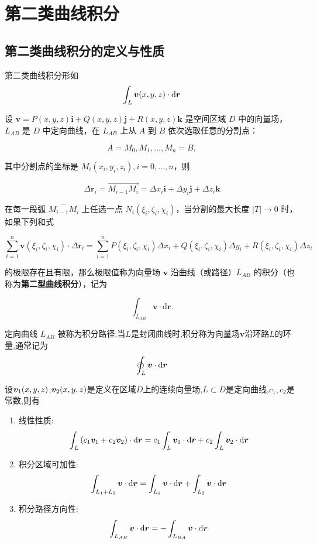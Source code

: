 \setcounter{chapter}{27} %

\chapter{第二类曲线积分}

\section{第二类曲线积分的定义与性质}

第二类曲线积分形如$$\int_L \bm{v}(x,y,z) \cdot \operatorname{d\!} \bm{r}$$

\begin{definition}
    设 $\bm{v} = P(x,y,z)\bm{i} + Q(x,y,z)\bm{j} + R(x,y,z)\bm{k}$ 是空间区域 $D$ 中的向量场，$L_{AB}$ 是 $D$ 中定向曲线，在 $L_{AB}$ 上从 $A$ 到 $B$ 依次选取任意的分割点：

\[
A = M_0, M_1, \dots, M_n = B,
\]

其中分割点的坐标是 $M_i(x_i, y_i, z_i), i = 0, \dots, n$，则

\[
\Delta \bm{r}_i = \overrightarrow{M_{i-1}M_i} = \Delta x_i \bm{i} + \Delta y_i \bm{j} + \Delta z_i \bm{k}
\]

在每一段弧 $\overset{\frown}{M_{i-1}M_i}$ 上任选一点 $N_i(\xi_i, \zeta_i, \chi_i)$，当分割的最大长度 $|T| \to 0$ 时，如果下列和式

\[
\sum_{i=1}^{n} \bm{v}(\xi_i, \zeta_i, \chi_i) \cdot \Delta \bm{r}_i = \sum_{i=1}^{n}  P(\xi_i, \zeta_i, \chi_i)\Delta x_i + Q(\xi_i, \zeta_i, \chi_i)\Delta y_i + R(\xi_i, \zeta_i, \chi_i)\Delta z_i 
\]

的极限存在且有限，那么极限值称为向量场 $\bm{v}$ 沿曲线（或路径）$L_{AB}$ 的积分（也称为\textbf{第二型曲线积分}），记为

\[
\int_{L_{AB}} \bm{v} \cdot \mathrm{d}\bm{r}.
\]

定向曲线 $L_{AB}$ 被称为积分路径.当$L$是封闭曲线时,积分称为向量场$\bm v$沿环路$L$的环量,通常记为
$$\oint_L \bm v \cdot \operatorname{d\!} \bm r$$
\end{definition}

\begin{proposition}
    设$\bm{v}_1(x,y,z)$,$\bm{v}_2(x,y,z)$是定义在区域$D$上的连续向量场,$L \subset D$是定向曲线,$c_1,c_2$是常数,则有
    \begin{enumerate}
        \item 线性性质:$$\int_L \left( c_1 \bm{v}_1 + c_2 \bm{v}_2 \right) \cdot \operatorname{d\!} \bm r = c_1 \int_L \bm{v}_1 \cdot \operatorname{d\!} \bm r + c_2 \int_L \bm{v}_2 \cdot \operatorname{d\!} \bm r$$
        \item 积分区域可加性:$$\int_{L_1 + L_2} \bm{v} \cdot \operatorname{d\!} \bm r = \int_{L_1} \bm{v} \cdot \operatorname{d\!} \bm r + \int_{L_2} \bm{v} \cdot \operatorname{d\!} \bm r$$
        \item 积分路径方向性:$$\int_{L_{AB}} \bm{v} \cdot \operatorname{d\!} \bm{r} = - \int_{L_{BA}} \bm{v} \cdot \operatorname{d\!} \bm r$$
    \end{enumerate}
\end{proposition}

